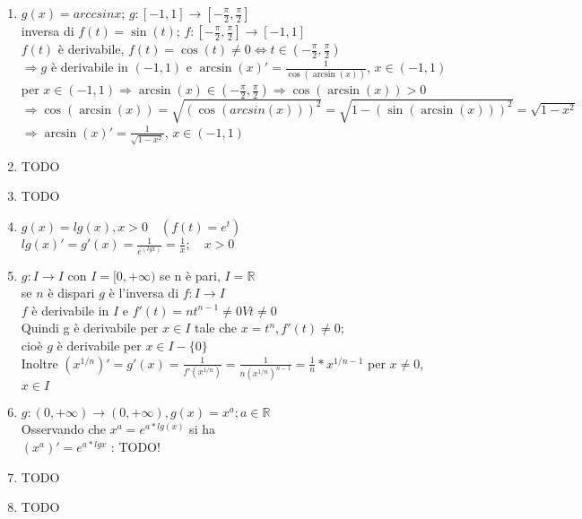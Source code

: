\documentclass{article}
\begin{document}
\begin{enumerate}
    \item $g(x) = arccsinx$; $g:[-1,1] \to [-\frac{\pi}{2}, \frac{\pi}{2}]$\\
        inversa di $f(t) = \sin(t)$; $f: [-\frac{\pi}{2}, \frac{\pi}{2}] \to [-1, 1]$\\
        $f(t)$ è derivabile, $f(t) = \cos(t) \neq 0 \Leftrightarrow t \in (-\frac{\pi}{2}, \frac{\pi}{2})$\\
        $\Rightarrow g$ è derivabile in $(-1, 1)$ e $\arcsin(x)' = \frac{1}{\cos(\arcsin(x))}$, $x \in (-1, 1)$\\
        per $x \in (-1, 1) \Rightarrow \arcsin(x) \in (-\frac{\pi}{2}, \frac{\pi}{2}) \Rightarrow \cos(\arcsin(x)) > 0$\\
        $\Rightarrow \cos(\arcsin(x)) = \sqrt{(\cos(arcsin(x)))^2} = \sqrt{1-(\sin(\arcsin(x)))^2} = \sqrt{1-x^2}$\\
        $\Rightarrow \arcsin(x)' = \frac{1}{\sqrt{1-x^2}}$, $x \in (-1, 1)$

    \item TODO

    \item TODO

    \item $g(x) = lg(x), x>0 \quad (f(t)=e^t)$\\
        $lg(x)' = g'(x) = \frac{1}{e^{(lgx)}} = \frac{1}{x}; \quad x>0$

    \item $g: I \to I$ con $I = [0, +\infty)$ se n è pari, $I = \mathbb{R}$\\
        se $n$ è dispari $g$ è l'inversa di $f:I \to I$\\
        $f$ è derivabile in $I$ e $f'(t)=nt^{n-1} \neq 0 Vt \neq 0$\\
        Quindi g è derivabile per $x \in I$ tale che $x=t^n, f'(t) \neq 0;$\\
        cioè $g$ è derivabile per $x \in I - \{0\}$\\
        Inoltre $(x^{1/n})' = g'(x) = \frac{1}{f'(x^{1/n})} = \frac{1}{n(x^{1/n})^{n-1}} = \frac{1}{n} * x^{1/n-1}$ per $x \neq 0$, $x \in I$

    \item $g:(0, +\infty) \to (0, +\infty), g(x)=x^a; a\in \mathbb{R}$\\
        Osservando che $x^a=e^{a*lg(x)}$ si ha\\
        $(x^a)' = e^{a*lgx}$ : TODO!
    \item TODO
    \item TODO

\end{enumerate}
\end{document}
